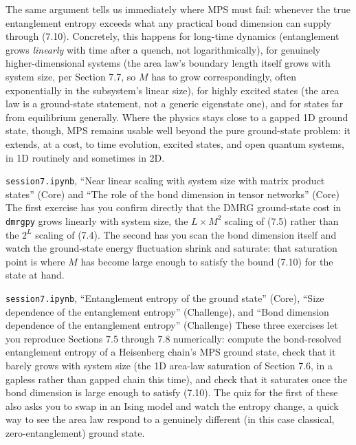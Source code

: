 

The same argument tells us immediately where MPS must fail: whenever the true entanglement entropy
exceeds what any practical bond dimension can supply through (7.10). Concretely, this happens for
long-time dynamics (entanglement grows \emph{linearly} with time after a quench, not logarithmically), for
genuinely higher-dimensional systems (the area law's boundary length itself grows with system size, per
Section 7.7, so $M$ has to grow correspondingly, often exponentially in the subsystem's linear size),
for highly excited states (the area law is a ground-state statement, not a generic eigenstate one), and
for states far from equilibrium generally. Where the physics stays close to a gapped 1D ground state,
though, MPS remains usable well beyond the pure ground-state problem: it extends, at a cost, to time
evolution, excited states, and open quantum systems, in 1D routinely and sometimes in 2D.

\begin{notebookbox}{\texttt{session7.ipynb}, ``Near linear scaling with system size with matrix product states'' (Core) and ``The role of the bond dimension in tensor networks'' (Core)}
The first exercise has you confirm directly that the DMRG ground-state cost in \texttt{dmrgpy} grows
linearly with system size, the $L\times M^2$ scaling of (7.5) rather than the $2^L$ scaling of (7.4).
The second has you scan the bond dimension itself and watch the ground-state energy fluctuation
shrink and saturate: that saturation point is where $M$ has become large enough to satisfy the bound
(7.10) for the state at hand.
\end{notebookbox}

\begin{notebookbox}{\texttt{session7.ipynb}, ``Entanglement entropy of the ground state'' (Core), ``Size dependence of the entanglement entropy'' (Challenge), and ``Bond dimension dependence of the entanglement entropy'' (Challenge)}
These three exercises let you reproduce Sections 7.5 through 7.8 numerically: compute the
bond-resolved entanglement entropy of a Heisenberg chain's MPS ground state, check that it barely
grows with system size (the 1D area-law saturation of Section 7.6, in a gapless rather than gapped
chain this time), and check that it saturates once the bond dimension is large enough to satisfy
(7.10). The quiz for the first of these also asks you to swap in an Ising model and watch the entropy
change, a quick way to see the area law respond to a genuinely different (in this case classical,
zero-entanglement) ground state.
\end{notebookbox}

